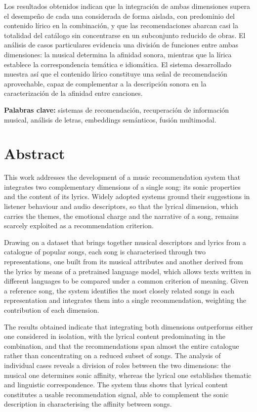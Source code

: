 \documentclass[12pt,a4paper,oneside]{report}
\begin{document}
Los resultados obtenidos indican que la integración de ambas dimensiones supera el desempeño de cada una considerada de forma aislada, con predominio del contenido lírico en la combinación, y que las recomendaciones abarcan casi la totalidad del catálogo sin concentrarse en un subconjunto reducido de obras. El análisis de casos particulares evidencia una división de funciones entre ambas dimensiones: la musical determina la afinidad sonora, mientras que la lírica establece la correspondencia temática e idiomática. El sistema desarrollado muestra así que el contenido lírico constituye una señal de recomendación aprovechable, capaz de complementar a la descripción sonora en la caracterización de la afinidad entre canciones.

\vspace{0.5cm}
\noindent\textbf{Palabras clave:} sistemas de recomendación, recuperación de información musical, análisis de letras, embeddings semánticos, fusión multimodal.

\clearpage

\chapter*{Abstract}
{}

This work addresses the development of a music recommendation system that integrates two complementary dimensions of a single song: its sonic properties and the content of its lyrics. Widely adopted systems ground their suggestions in listener behaviour and audio descriptors, so that the lyrical dimension, which carries the themes, the emotional charge and the narrative of a song, remains scarcely exploited as a recommendation criterion.

Drawing on a dataset that brings together musical descriptors and lyrics from a catalogue of popular songs, each song is characterised through two representations, one built from its musical attributes and another derived from the lyrics by means of a pretrained language model, which allows texts written in different languages to be compared under a common criterion of meaning. Given a reference song, the system identifies the most closely related songs in each representation and integrates them into a single recommendation, weighting the contribution of each dimension.

The results obtained indicate that integrating both dimensions outperforms either one considered in isolation, with the lyrical content predominating in the combination, and that the recommendations span almost the entire catalogue rather than concentrating on a reduced subset of songs. The analysis of individual cases reveals a division of roles between the two dimensions: the musical one determines sonic affinity, whereas the lyrical one establishes thematic and linguistic correspondence. The system thus shows that lyrical content constitutes a usable recommendation signal, able to complement the sonic description in characterising the affinity between songs.
\end{document}
